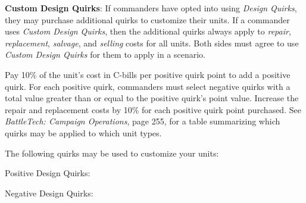 \item {\bfseries Custom Design Quirks}: If commanders have opted into using \emph{Design Quirks}, they may purchase additional quirks to customize their units.
If a commander uses \emph{Custom Design Quirks}, then the additional quirks always apply to \emph{repair}, \emph{replacement}, \emph{salvage}, and \emph{selling} costs for all units.
Both sides must agree to use \emph{Custom Design Quirks} for them to apply in a scenario.

Pay 10\% of the unit's cost in C-bills per positive quirk point to add a positive quirk.
For each positive quirk, commanders must select negative quirks with a total value greater than or equal to the positive quirk's point value.
Increase the repair and replacement costs by 10\% for each positive quirk point purchased.
See \emph{BattleTech: Campaign Operations}, page 255, for a table summarizing which quirks may be applied to which unit types.

The following quirks may be used to customize your units:

Positive Design Quirks:



Negative Design Quirks:



